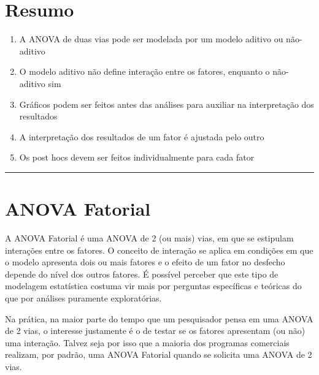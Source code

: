 \documentclass[
]{book}
\providecommand{\tightlist}{%
  \setlength{\itemsep}{0pt}\setlength{\parskip}{0pt}}
\begin{document}
\hypertarget{resumo-7}{%
\section{Resumo}\label{resumo-7}}

\begin{explore}

\begin{enumerate}
\def\labelenumi{\arabic{enumi}.}
\tightlist
\item
  A ANOVA de duas vias pode ser modelada por um modelo aditivo ou não-aditivo
\item
  O modelo aditivo não define interação entre os fatores, enquanto o não-aditivo sim\\
\item
  Gráficos podem ser feitos antes das análises para auxiliar na interpretação dos resultados\\
\item
  A interpretação dos resultados de um fator é ajustada pelo outro\\
\item
  Os post hocs devem ser feitos individualmente para cada fator\\
\end{enumerate}

\end{explore}

\begin{center}\rule{0.5\linewidth}{0.5pt}\end{center}

\hypertarget{anova-fatorial}{%
\section{ANOVA Fatorial}\label{anova-fatorial}}

A ANOVA Fatorial é uma ANOVA de 2 (ou mais) vias, em que se estipulam interações entre os fatores. O conceito de interação se aplica em condições em que o modelo apresenta dois ou mais fatores e o efeito de um fator no desfecho depende do nível dos outros fatores. É possível perceber que este tipo de modelagem estatística costuma vir mais por perguntas específicas e teóricas do que por análises puramente exploratórias.

Na prática, na maior parte do tempo que um pesquisador pensa em uma ANOVA de 2 vias, o interesse justamente é o de testar se os fatores apresentam (ou não) uma interação. Talvez seja por isso que a maioria dos programas comerciais realizam, por padrão, uma ANOVA Fatorial quando se solicita uma ANOVA de 2 vias.
\end{document}
